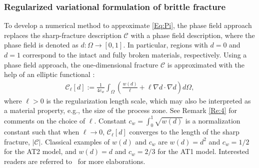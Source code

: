 \subsubsection{Regularized variational formulation of brittle fracture}
To develop a numerical method to approximate \eqref{Eq:Pi}, {the phase field approach replaces} the sharp-fracture description $\mathcal{C}$ with a phase field description, where the phase field is denoted as  $d:\Omega\rightarrow[0,1]$. In particular, regions with $d = 0$ and $d = 1$ correspond to the intact and fully broken materials, respectively. Using a phase field approach, the one-dimensional fracture $\mathcal{C}$ is approximated with the help of an elliptic %
functional \cite{ambrosio1990approximation, ambrosio1992approximation}:
\begin{equation}\label{Eq:Gamma_ell}
    \begin{aligned}
    \mathcal{C}_\ell[d]:=\frac{1}{4c_w}\int_\Omega\left(\frac{w(d)}{\ell} + \ell \nabla d\cdot\nabla d\right) d\Omega,  
    \end{aligned}
\end{equation}
where $\ell>0$ is the regularization length scale, which may also be interpreted as a material property, e.g., the size of the process zone. See Remark \ref{Re:4} for comments on the choice of $\ell$. Constant $c_w=\int_{0}^{1} \sqrt{w(d)}$ is a normalization constant such that when $\ell\rightarrow 0$, {$\mathcal{C}_\ell[d]$} converges to the {length of the} sharp fracture{, $|\mathcal{C}|$}. Classical examples of $w(d)$ and $c_{w}$ are $w(d)=d^2$ and $c_{w}=1/2$ for the AT2 model, and $w(d)=d$ and $c_{w}=2/3$ for the AT1 model. Interested readers are referred to \cite{tanne2018crack,Bourdin2014014301}~for more elaborations.


